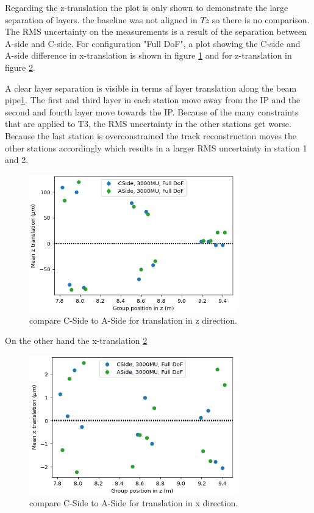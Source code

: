 Regarding the z-translation the plot is only shown to demonstrate the large separation of layers. the baseline was not aligned in $Tz$ so there is no comparison.
The RMS uncertainty on the measurements is a result of the separation between A-side and C-side. For configuration "Full DoF", a plot showing the C-side and A-side difference in x-translation is shown in figure \ref{fig:june_5} and for z-translation in figure \ref{fig:june_6}.

A clear layer separation is visible in terms af layer translation along the beam pipe\ref{fig:june_5}.
The first and third layer in each station move away from the IP and the second and
fourth layer move towards the IP.
Because of the many constraints that are applied to T3, the RMS uncertainty in the other stations get worse. Because the last station is overconstrained the track reconstruction moves the other stations accordingly which results in a larger RMS uncertainty in station 1 and 2.

\begin{figure}
  \centering
  \includegraphics[width=0.8\textwidth]{plots/renewed_plots/CA_allT_halfT3_Tz.png}
  \caption{compare C-Side to A-Side for translation in z direction.}
  \label{fig:june_5}
\end{figure}
On the other hand the x-translation \ref{fig:june_6}
\begin{figure}
  \centering
  \includegraphics[width=0.8\textwidth]{plots/renewed_plots/CA_allT_halfT3_Tx.png}
  \caption{compare C-Side to A-Side for translation in x direction.}
  \label{fig:june_6}
\end{figure}

